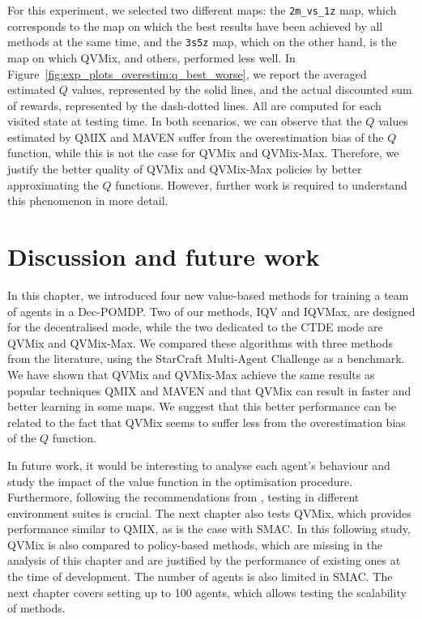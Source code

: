 For this experiment, we selected two different maps: the \texttt{2m\_vs\_1z} map, which corresponds to the map on which the best results have been achieved by all methods at the same time, and the \texttt{3s5z} map, which on the other hand, is the map on which QVMix, and others, performed less well.
In Figure~\ref{fig:exp_plots_overestim:q_best_worse}, we report the averaged estimated $Q$ values, represented by the solid lines, and the actual discounted sum of rewards, represented by the dash-dotted lines.
All are computed for each visited state at testing time.
In both scenarios, we can observe that the $Q$ values estimated by QMIX and MAVEN suffer from the overestimation bias of the $Q$ function, while this is not the case for QVMix and QVMix-Max.
Therefore, we justify the better quality of QVMix and QVMix-Max policies by better approximating the $Q$ functions.
However, further work is required to understand this phenomenon in more detail.

\section{Discussion and future work} \label{sec:ch4_conclusion}

In this chapter, we introduced four new value-based methods for training a team of agents in a Dec-POMDP.
Two of our methods, IQV and IQVMax, are designed for the decentralised mode, while the two dedicated to the CTDE mode are QVMix and QVMix-Max.
We compared these algorithms with three methods from the literature, using the StarCraft Multi-Agent Challenge as a benchmark.
We have shown that QVMix and QVMix-Max achieve the same results as popular techniques QMIX and MAVEN and that QVMix can result in faster and better learning in some maps.
We suggest that this better performance can be related to the fact that QVMix seems to suffer less from the overestimation bias of the $Q$ function.

In future work, it would be interesting to analyse each agent's behaviour and study the impact of the value function in the optimisation procedure.
Furthermore, following the recommendations from \citep{gorsane2022towards}, testing in different environment suites is crucial. 
The next chapter also tests QVMix, which provides performance similar to QMIX, as is the case with SMAC.
In this following study, QVMix is also compared to policy-based methods, which are missing in the analysis of this chapter and are justified by the performance of existing ones at the time of development.
The number of agents is also limited in SMAC.
The next chapter covers setting up to 100 agents, which allows testing the scalability of methods.

